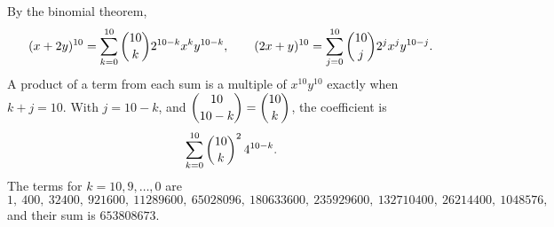 By the binomial theorem,
\[(x+2y)^{10}=\sum_{k=0}^{10}\dbinom{10}{k}2^{10-k}x^ky^{10-k},\qquad (2x+y)^{10}=\sum_{j=0}^{10}\dbinom{10}{j}2^jx^jy^{10-j}.\]
A product of a term from each sum is a multiple of $x^{10}y^{10}$ exactly when $k+j=10$. With $j=10-k$, and $\dbinom{10}{10-k}=\dbinom{10}{k}$, the coefficient is
\[\sum_{k=0}^{10}\dbinom{10}{k}^2\,4^{10-k}.\]
The terms for $k=10,9,\dots,0$ are
\[1,\ 400,\ 32400,\ 921600,\ 11289600,\ 65028096,\ 180633600,\ 235929600,\ 132710400,\ 26214400,\ 1048576,\]
and their sum is $\boxed{653808673}$.
